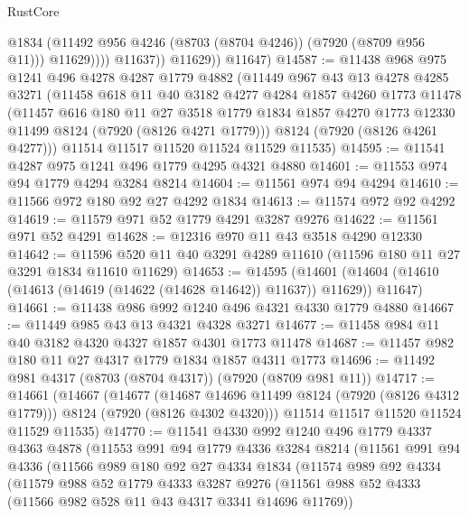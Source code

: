 \begin{lexlean}{RustCore}
\begin{coremodule}
                      @1834
                      (@11492 @956 @4246 (@8703 (@8704 @4246)) (@7920 (@8709 @956 @11)))
                      @11629))))
              @11637))
          @11629))
      @11647)
@14587 := @11438
    @968
    @975
    @1241
    @496
    @4278
    @4287
    @1779
    @4882
    (@11449
      @967
      @43
      @13
      @4278
      @4285
      @3271
      (@11458
        @618
        @11
        @40
        @3182
        @4277
        @4284
        @1857
        @4260
        @1773
        @11478
        (@11457
          @616
          @180
          @11
          @27
          @3518
          @1779
          @1834
          @1857
          @4270
          @1773
          @12330
          @11499
          @8124
          (@7920 (@8126 @4271 @1779)))
        @8124
        (@7920 (@8126 @4261 @4277)))
      @11514
      @11517
      @11520
      @11524
      @11529
      @11535)
@14595 := @11541 @4287 @975 @1241 @496 @1779 @4295 @4321 @4880
@14601 := @11553 @974 @94 @1779 @4294 @3284 @8214
@14604 := @11561 @974 @94 @4294
@14610 := @11566 @972 @180 @92 @27 @4292 @1834
@14613 := @11574 @972 @92 @4292
@14619 := @11579 @971 @52 @1779 @4291 @3287 @9276
@14622 := @11561 @971 @52 @4291
@14628 := @12316 @970 @11 @43 @3518 @4290 @12330
@14642 := @11596 @520 @11 @40 @3291 @4289 @11610 (@11596 @180 @11 @27 @3291 @1834 @11610 @11629)
@14653 := @14595
    (@14601 (@14604 (@14610 (@14613 (@14619 (@14622 (@14628 @14642)) @11637)) @11629)) @11647)
@14661 := @11438 @986 @992 @1240 @496 @4321 @4330 @1779 @4880
@14667 := @11449 @985 @43 @13 @4321 @4328 @3271
@14677 := @11458 @984 @11 @40 @3182 @4320 @4327 @1857 @4301 @1773 @11478
@14687 := @11457 @982 @180 @11 @27 @4317 @1779 @1834 @1857 @4311 @1773
@14696 := @11492 @981 @4317 (@8703 (@8704 @4317)) (@7920 (@8709 @981 @11))
@14717 := @14661
    (@14667
      (@14677
        (@14687 @14696 @11499 @8124 (@7920 (@8126 @4312 @1779)))
        @8124
        (@7920 (@8126 @4302 @4320)))
      @11514
      @11517
      @11520
      @11524
      @11529
      @11535)
@14770 := @11541
    @4330
    @992
    @1240
    @496
    @1779
    @4337
    @4363
    @4878
    (@11553
      @991
      @94
      @1779
      @4336
      @3284
      @8214
      (@11561
        @991
        @94
        @4336
        (@11566
          @989
          @180
          @92
          @27
          @4334
          @1834
          (@11574
            @989
            @92
            @4334
            (@11579
              @988
              @52
              @1779
              @4333
              @3287
              @9276
              (@11561 @988 @52 @4333 (@11566 @982 @528 @11 @43 @4317 @3341 @14696 @11769))

\end{coremodule}
\end{lexlean}
